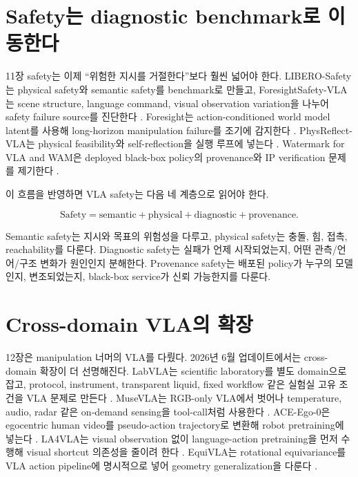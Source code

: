 \section{Safety는 diagnostic benchmark로 이동한다}

11장 safety는 이제 ``위험한 지시를 거절한다''보다 훨씬 넓어야 한다. LIBERO-Safety는 physical safety와 semantic safety를 benchmark로 만들고, ForesightSafety-VLA는 scene structure, language command, visual observation variation을 나누어 safety failure source를 진단한다 \citep{liberosafety2026,foresightsafety2026}. Foresight는 action-conditioned world model latent를 사용해 long-horizon manipulation failure를 조기에 감지한다 \citep{foresight2026}. PhysReflect-VLA는 physical feasibility와 self-reflection을 실행 루프에 넣는다 \citep{physreflectvla2026}. Watermark for VLA and WAM은 deployed black-box policy의 provenance와 IP verification 문제를 제기한다 \citep{vlawatermark2026}.

이 흐름을 반영하면 VLA safety는 다음 네 계층으로 읽어야 한다.

\begin{equation}
  \mathrm{Safety}
  =
  \mathrm{semantic}
  +
  \mathrm{physical}
  +
  \mathrm{diagnostic}
  +
  \mathrm{provenance}.
\end{equation}

Semantic safety는 지시와 목표의 위험성을 다루고, physical safety는 충돌, 힘, 접촉, reachability를 다룬다. Diagnostic safety는 실패가 언제 시작되었는지, 어떤 관측/언어/구조 변화가 원인인지 분해한다. Provenance safety는 배포된 policy가 누구의 모델인지, 변조되었는지, black-box service가 신뢰 가능한지를 다룬다.

\section{Cross-domain VLA의 확장}

12장은 manipulation 너머의 VLA를 다뤘다. 2026년 6월 업데이트에서는 cross-domain 확장이 더 선명해진다. LabVLA는 scientific laboratory를 별도 domain으로 잡고, protocol, instrument, transparent liquid, fixed workflow 같은 실험실 고유 조건을 VLA 문제로 만든다 \citep{labvla2026}. MuseVLA는 RGB-only VLA에서 벗어나 temperature, audio, radar 같은 on-demand sensing을 tool-call처럼 사용한다 \citep{musevla2026}. ACE-Ego-0은 egocentric human video를 pseudo-action trajectory로 변환해 robot pretraining에 넣는다 \citep{aceego2026}. LA4VLA는 visual observation 없이 language-action pretraining을 먼저 수행해 visual shortcut 의존성을 줄이려 한다 \citep{la4vla2026}. EquiVLA는 rotational equivariance를 VLA action pipeline에 명시적으로 넣어 geometry generalization을 다룬다 \citep{equivla2026}.

